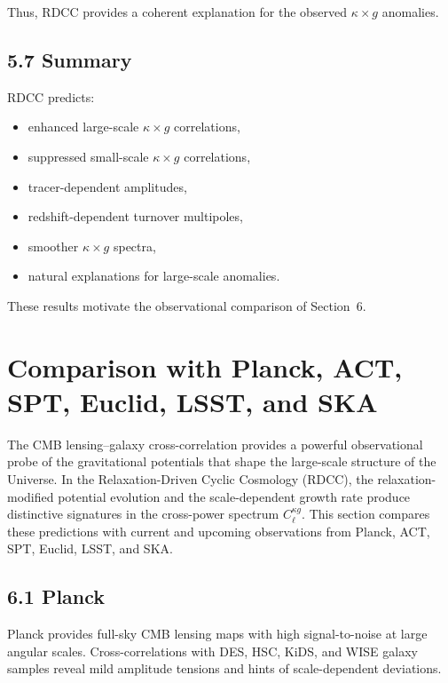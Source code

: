 \documentclass[11pt,a4paper]{article}
\begin{document}
Thus, RDCC provides a coherent explanation for the observed $\kappa \times g$ anomalies.

\subsection*{5.7 Summary}

RDCC predicts:

\begin{itemize}
    \item enhanced large-scale $\kappa \times g$ correlations,
    \item suppressed small-scale $\kappa \times g$ correlations,
    \item tracer-dependent amplitudes,
    \item redshift-dependent turnover multipoles,
    \item smoother $\kappa \times g$ spectra,
    \item natural explanations for large-scale anomalies.
\end{itemize}

These results motivate the observational comparison of Section~6.

\section{Comparison with Planck, ACT, SPT, Euclid, LSST, and SKA}

The CMB lensing–galaxy cross-correlation provides a powerful observational probe of the 
gravitational potentials that shape the large-scale structure of the Universe. In the 
Relaxation-Driven Cyclic Cosmology (RDCC), the relaxation-modified potential evolution and 
the scale-dependent growth rate produce distinctive signatures in the cross-power spectrum 
$C_{\ell}^{\kappa g}$. This section compares these predictions with current and upcoming 
observations from Planck, ACT, SPT, Euclid, LSST, and SKA.

\subsection*{6.1 Planck}

Planck provides full-sky CMB lensing maps with high signal-to-noise at large angular scales. 
Cross-correlations with DES, HSC, KiDS, and WISE galaxy samples reveal mild amplitude 
tensions and hints of scale-dependent deviations.
\end{document}
